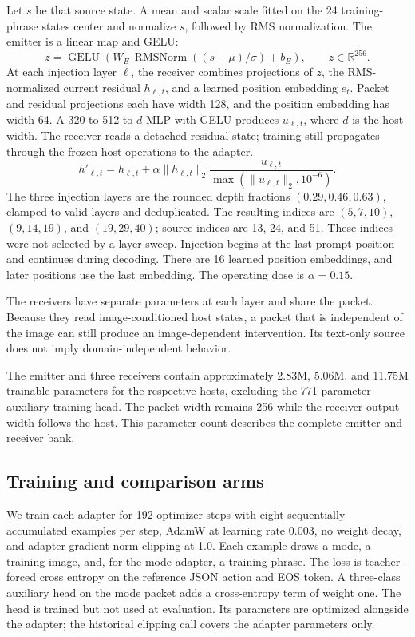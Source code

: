 \documentclass[10pt]{article}
\begin{document}
Let $s$ be that source state. A mean and scalar scale fitted on the
24 training-phrase states center and normalize $s$, followed by RMS
normalization. The emitter is a linear map and GELU:
\begin{equation}
 z=\operatorname{GELU}(W_E\,\operatorname{RMSNorm}((s-\mu)/\sigma)+b_E),
 \qquad z\in\mathbb{R}^{256}.
\end{equation}
At each injection layer $\ell$, the receiver combines projections of
$z$, the RMS-normalized current residual $h_{\ell,t}$, and a learned
position embedding $e_t$. Packet and residual projections each have
width 128, and the position embedding has width 64. A 320-to-512-to-$d$
MLP with GELU produces $u_{\ell,t}$, where $d$ is the host width.
The receiver reads a detached residual state; training still propagates
through the frozen host operations to the adapter.
\begin{equation}
 h'_{\ell,t}=h_{\ell,t}
   +\alpha\lVert h_{\ell,t}\rVert_2
       \frac{u_{\ell,t}}{\max(\lVert u_{\ell,t}\rVert_2,10^{-6})}.
\end{equation}
The three injection layers are the rounded depth fractions
$(0.29,0.46,0.63)$, clamped to valid layers and deduplicated. The resulting
indices are $(5,7,10)$, $(9,14,19)$, and $(19,29,40)$; source indices
are 13, 24, and 51. These indices were not selected by a layer sweep.
Injection begins at the last prompt position and continues during
decoding. There are 16 learned position embeddings, and later positions
use the last embedding. The operating dose is $\alpha=0.15$.

The receivers have separate parameters at each layer and share the
packet. Because they read image-conditioned host states, a packet that
is independent of the image can still produce an image-dependent
intervention. Its text-only source does not imply domain-independent
behavior.

The emitter and three receivers contain approximately 2.83M, 5.06M,
and 11.75M trainable parameters for the respective hosts, excluding
the 771-parameter auxiliary training head. The packet width remains
256 while the receiver output width follows the host. This parameter
count describes the complete emitter and receiver bank.

\subsection{Training and comparison arms}
We train each adapter for 192 optimizer steps with eight sequentially
accumulated examples per step, AdamW at learning rate 0.003, no weight
decay, and adapter gradient-norm clipping at 1.0. Each example draws a
mode, a training image, and, for the mode adapter, a training phrase.
The loss is teacher-forced cross entropy on the reference JSON action
and EOS token. A three-class auxiliary head on the mode packet adds a
cross-entropy term of weight one. The head is trained but not used at
evaluation. Its parameters are optimized alongside the adapter; the
historical clipping call covers the adapter parameters only.
\end{document}
